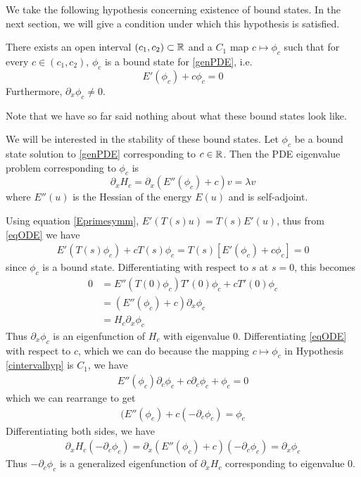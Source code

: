 \documentclass[thesis.tex]{subfiles}
\begin{document}
We take the following hypothesis concerning existence of bound states. In the next section, we will give a condition under which this hypothesis is satisfied. 
\begin{hypothesis}\label{cintervalhyp}
There exists an open interval $(c_1, c_2) \subset {\mathbb R}$ and a $C_1$ map $c \mapsto \phi_c$ such that for every $c \in (c_1, c_2)$, $\phi_c$ is a bound state for \eqref{genPDE}, i.e. 
\[
E'(\phi_c) + c \phi_c = 0 
\]
Furthermore, $\partial_x \phi_c \neq 0$.
\end{hypothesis}
Note that we have so far said nothing about what these bound states look like.

We will be interested in the stability of these bound states. Let $\phi_c$ be a bound state solution to \eqref{genPDE} corresponding to $c \in {\mathbb R}$. Then the PDE eigenvalue problem corresponding to $\phi_c$ is
\begin{equation}\label{PDEeig}
\partial_x H_c = 
\partial_x (E''(\phi_c) + c )v = \lambda v
\end{equation}
where $E''(u)$ is the Hessian of the energy $E(u)$ and is self-adjoint. 

Using equation \eqref{Eprimesymm}, $E'(T(s)u) = T(s)E'(u)$, thus from \eqref{eqODE} we have
\begin{align}\label{TeqODE}
E'(T(s)\phi_c) + c T(s)\phi_c = T(s)[E'(\phi_c) + c \phi_c] = 0
\end{align}
since $\phi_c$ is a bound state. Differentiating with respect to $s$ at $s = 0$, this becomes
\begin{align*}
0 &= E''(T(0)\phi_c)T'(0)\phi_c + c T'(0)\phi_c \\
&= (E''(\phi_c) + c ) \partial_x \phi_c \\
&= H_c \partial_x \phi_c
\end{align*}
Thus $\partial_x \phi_c$ is an eigenfunction of $H_c$ with eigenvalue 0. Differentiating \eqref{eqODE} with respect to $c$, which we can do because the mapping $c \mapsto \phi_c$ in Hypothesis \ref{cintervalhyp} is $C_1$, we have
\begin{align*}
E''(\phi_c)\partial_c \phi_c + c \partial_c \phi_c + \phi_c = 0
\end{align*}
which we can rearrange to get 
\begin{align*}
(E''(\phi_c) + c (-\partial_c \phi_c) = \phi_c
\end{align*}
Differentiating both sides, we have
\begin{align*}
\partial_x H_c (-\partial_c \phi_c) 
= \partial_x (E''(\phi_c) + c )(-\partial_c \phi_c) = \partial_x\phi_c
\end{align*}
Thus $-\partial_c \phi_c$ is a generalized eigenfunction of $\partial_x H_c$ corresponding to eigenvalue 0.
\end{document}
